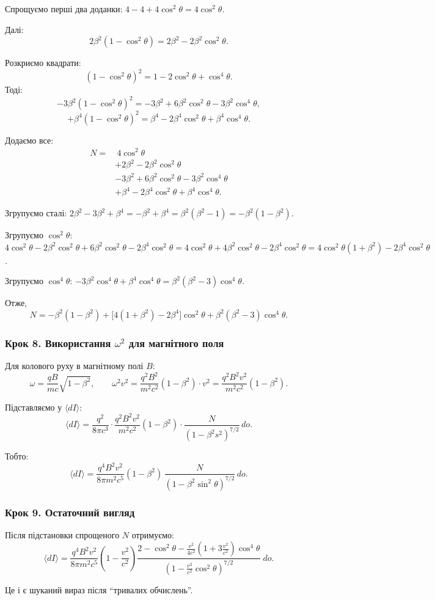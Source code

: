 \documentclass[a4paper,12pt]{article}
\begin{document}
Спрощуємо перші два доданки: $4 - 4 + 4\cos^2\theta = 4\cos^2\theta$.

Далі:
\[
2\beta^2(1-\cos^2\theta) = 2\beta^2 - 2\beta^2\cos^2\theta.
\]

Розкриємо квадрати:
\[
(1-\cos^2\theta)^2 = 1 - 2\cos^2\theta + \cos^4\theta.
\]
Тоді:
\[
-3\beta^2(1-\cos^2\theta)^2 = -3\beta^2 + 6\beta^2\cos^2\theta - 3\beta^2\cos^4\theta,
\]
\[
+\beta^4(1-\cos^2\theta)^2 = \beta^4 - 2\beta^4\cos^2\theta + \beta^4\cos^4\theta.
\]

Додаємо все:
\begin{align*}
N = &\ 4\cos^2\theta \\
&+ 2\beta^2 - 2\beta^2\cos^2\theta \\
&- 3\beta^2 + 6\beta^2\cos^2\theta - 3\beta^2\cos^4\theta \\
&+ \beta^4 - 2\beta^4\cos^2\theta + \beta^4\cos^4\theta.
\end{align*}

Згрупуємо сталі: $2\beta^2 - 3\beta^2 + \beta^4 = -\beta^2 + \beta^4 = \beta^2(\beta^2-1) = -\beta^2(1-\beta^2)$.

Згрупуємо $\cos^2\theta$: $4\cos^2\theta - 2\beta^2\cos^2\theta + 6\beta^2\cos^2\theta - 2\beta^4\cos^2\theta
= 4\cos^2\theta + 4\beta^2\cos^2\theta - 2\beta^4\cos^2\theta
= 4\cos^2\theta(1+\beta^2) - 2\beta^4\cos^2\theta$.

Згрупуємо $\cos^4\theta$: $-3\beta^2\cos^4\theta + \beta^4\cos^4\theta = \beta^2(\beta^2-3)\cos^4\theta$.

Отже,
\[
N = -\beta^2(1-\beta^2) + \bigl[4(1+\beta^2)-2\beta^4\bigr]\cos^2\theta + \beta^2(\beta^2-3)\cos^4\theta.
\]

\subsubsection{Крок 8. Використання $\omega^2$ для магнітного поля}
Для колового руху в магнітному полі $B$:
\[
\omega = \frac{qB}{mc}\sqrt{1-\beta^2}, \qquad
\omega^2 v^2 = \frac{q^2 B^2}{m^2 c^2}(1-\beta^2)\cdot v^2 = \frac{q^2 B^2 v^2}{m^2 c^2}(1-\beta^2).
\]

Підставляємо у $\langle dI \rangle$:
\[
\langle dI \rangle = \frac{q^2}{8\pi c^3}\cdot \frac{q^2 B^2 v^2}{m^2 c^2}(1-\beta^2) \cdot \frac{N}{(1-\beta^2 s^2)^{7/2}}\, do.
\]

Тобто:
\[
\langle dI \rangle = \frac{q^4 B^2 v^2}{8\pi m^2 c^5}(1-\beta^2)\, \frac{N}{(1-\beta^2\sin^2\theta)^{7/2}}\, do.
\]

\subsubsection{Крок 9. Остаточний вигляд}
Після підстановки спрощеного $N$ отримуємо:
\[
\boxed{
\langle dI \rangle = \frac{q^4 B^2 v^2}{8\pi m^2 c^5}\left(1-\frac{v^2}{c^2}\right)
\frac{2 - \cos^2\theta - \frac{v^2}{4c^2}\left(1+3\frac{v^2}{c^2}\right)\cos^4\theta}
{\left(1 - \frac{v^2}{c^2}\cos^2\theta\right)^{7/2}}\; do.
}
\]

Це і є шуканий вираз після ``тривалих обчислень''.
\end{document}
